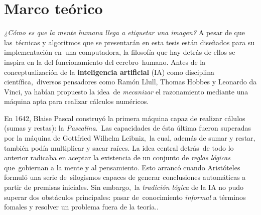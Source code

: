 \chapter{Marco teórico}

\noindent
\emph{¿Cómo es que la mente humana llega a etiquetar una imagen?} A pesar de que las\
técnicas y algoritmos que se presentarán en esta tesis están diseñados para su implementación en\
una computadora, la filosofía que hay detrás de ellos se inspira en la del funcionamiento del cerebro\
humano. Antes de la conceptualización de la \textbf{inteligencia artificial} (IA) como disciplina científica,\
diversos pensadores como Ramón Llull, Thomas Hobbes y Leonardo da Vinci, ya habían propuesto la idea\
de \emph{mecanizar} el razonamiento mediante una máquina apta para realizar cálculos numéricos. \cite{russell2010}\par
En 1642, Blaise Pascal construyó la primera máquina capaz de realizar cálulos (sumas y restas): la \emph{Pascalina}.\
Las capacidades de ésta última fueron superadas por la máquina de Gottfried Wilhelm Leibniz,\
la cual, además de sumar y restar, también podía multiplicar y sacar raíces. La idea central detrás\
de todo lo anterior radicaba en aceptar la existencia de un conjunto de \emph{reglas lógicas} que\
gobiernan a la mente y al pensamiento. Esto arrancó cuando Aristóteles formuló una serie de\
silogismos capaces de generar conclusiones automáticas a partir de premisas iniciales. Sin embargo,\
la \emph{tradición lógica} de la IA no pudo superar dos obstáculos principales: pasar de\
conocimiento \emph{informal} a términos fomales y resolver un problema fuera de la teoría.\cite{russell2010}.\par




